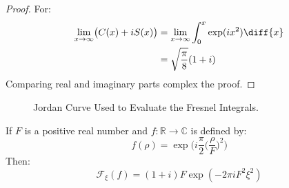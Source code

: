         \begin{proof}
            For:
            \begin{align}
                \underset{x\rightarrow\infty}{\lim}
                    \big(C(x)+iS(x)\big)
                &=\underset{x\rightarrow\infty}{\lim}
                    \int_{0}^{x}\exp(ix^{2})\diff{x}\\
                &=\sqrt{\frac{\pi}{8}}(1+i)
            \end{align}
            Comparing real and imaginary parts complex the proof.
        \end{proof}
        \begin{figure}[H]
            \centering
            \captionsetup{type=figure}
            
            \caption{Jordan Curve Used to Evaluate the Fresnel Integrals.}
            \label{fig:Jordan_Curve_Fresnel_Integrals}
        \end{figure}
        \par\hfill\par
        \begin{theorem}
            If $F$ is a positive real number and
            $f:\mathbb{R}\rightarrow\mathbb{C}$ is defined by:
            \begin{equation}
                f(\rho)=
                    \exp\bigg(
                        i\frac{\pi}{2}
                        \Big(\frac{\rho}{F}\Big)^{2}
                    \bigg)
            \end{equation}
            Then:
            \begin{equation}
                \mathcal{F}_{\xi}(f)
                =(1+i)F\exp(\minus{2}\pi{i}F^{2}\xi^{2})
            \end{equation}
        \end{theorem}

